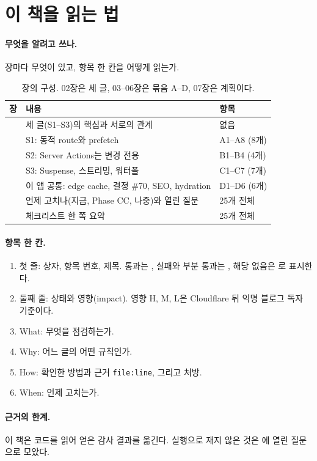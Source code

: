 \section{이 책을 읽는 법}\label{sec:ov-howto}

\paragraph{무엇을 알려고 쓰나.}
장마다 무엇이 있고, 항목 한 칸을 어떻게 읽는가.

\begin{table}[H]
  \caption{장의 구성. 02장은 세 글, 03--06장은 묶음 A--D, 07장은 계획이다.}
  \label{tab:ov-chapters}
  \centering\small
  \begin{tabularx}{\linewidth}{@{}L{2.4cm} Y L{2.2cm}@{}}
    \toprule
    장 & 내용 & 항목 \\
    \midrule
     & 세 글(S1--S3)의 핵심과 서로의 관계 & 없음 \\
    \midrule
     & S1: 동적 route와 prefetch & A1--A8 (8개) \\
    \midrule
     & S2: Server Actions는 변경 전용 & B1--B4 (4개) \\
    \midrule
     & S3: Suspense, 스트리밍, 워터폴 & C1--C7 (7개) \\
    \midrule
     & 이 앱 공통: edge cache, 결정 \#70, SEO, hydration & D1--D6 (6개) \\
    \midrule
     & 언제 고치나(지금, Phase CC, 나중)와 열린 질문 & 25개 전체 \\
    \midrule
     & 체크리스트 한 쪽 요약 & 25개 전체 \\
    \bottomrule
  \end{tabularx}
\end{table}

\paragraph{항목 한 칸.}
\begin{enumerate}[nosep]
  \item 첫 줄: 상자, 항목 번호, 제목. 통과는 \ckdone{}, 실패와 부분 통과는 \ckopen{}, 해당 없음은 \ckna{}로 표시한다.
  \item 둘째 줄: 상태와 영향(impact). 영향 H, M, L은 Cloudflare 뒤 익명 블로그 독자 기준이다.
  \item What: 무엇을 점검하는가.
  \item Why: 어느 글의 어떤 규칙인가.
  \item How: 확인한 방법과 근거 \texttt{file:line}, 그리고 처방.
  \item When: 언제 고치는가.
\end{enumerate}

\paragraph{근거의 한계.}
이 책은 코드를 읽어 얻은 감사 결과를 옮긴다.
실행으로 재지 않은 것은 에 열린 질문으로 모았다.
